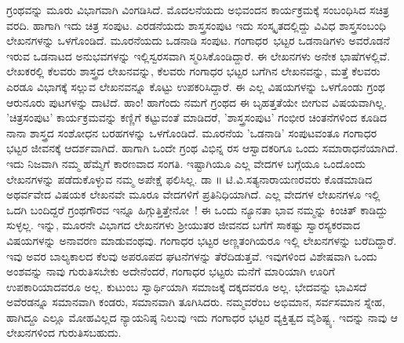 {ಗ್ರಂಥವನ್ನು ಮೂರು ವಿಭಾಗವಾಗಿ ವಿಂಗಡಿಸಿದೆ. ಮೊದಲನೆಯದು ಅಭಿವಂದನ ಕಾರ್ಯಕ್ರಮಕ್ಕೆ ಸಂಬಂಧಿಸಿದ ಸಚಿತ್ರ ವರದಿ. ಹಾಗಾಗಿ ಇದು ಚಿತ್ರ ಸಂಪುಟ. ಎರಡನೆಯದು ಶಾಸ್ತ್ರಸಂಪುಟ \enginline{-} ಇದು ಸಂಸ್ಕೃತದಲ್ಲಿದ್ದು ವಿವಿಧ ಶಾಸ್ತ್ರಸಂಬಂಧಿ ಲೇಖನಗಳನ್ನು ಒಳಗೊಂಡಿದೆ. ಮೂರನೆಯದು  ಒಡನಾಡಿ ಸಂಪುಟ. \hbox{ಗಂಗಾಧರ ಭಟ್ಟರ} ಒಡನಾಡಿಗಳು ಅವರೊಡನೆ ಇರುವ ಒಡನಾಟದ ಅನುಭವಗಳನ್ನು ಇಲ್ಲಿ\break ಸ್ವರಸವಾಗಿ ಸ್ಮರಿಸಿಕೊಂಡಿದ್ದಾರೆ. ಈ ಲೇಖನಗಳು ಅನೇಕ ಭಾಷೆಗಳಲ್ಲಿವೆ. \hbox{ಲೇಖಕರಲ್ಲಿ} ಕೆಲವರು ಶಾಸ್ತ್ರದ ಲೇಖನವನ್ನು, ಕೆಲವರು ಗಂಗಾಧರ ಭಟ್ಟರ ಬಗೆಗಿನ ಲೇಖನವನ್ನು, ಮತ್ತೆ ಕೆಲವರು ಎರಡೂ ವಿಭಾಗಕ್ಕೆ ಸಲ್ಲುವ ಲೇಖನ\-ವನ್ನೂ ಕೊಟ್ಟು ಉಪಕರಿಸಿದ್ದಾರೆ. ಈ ಎಲ್ಲ ವಿಷಯಗಳನ್ನು ಒಳಗೊಂಡು ಗ್ರಂಥ ಆರುನೂರು ಪುಟಗಳನ್ನು \hbox{ದಾಟಿದೆ.} ಹಾಂ! ಹಾಗೆಂದು ನಮಗೆ ಗ್ರಂಥದ ಈ ಬೃಹತ್ತತೆಯೇ ಬೀಗುವ ವಿಷಯವಾಗಿಲ್ಲ. 'ಚಿತ್ರ\-ಸಂಪುಟ' ಕಾರ್ಯಕ್ರಮವನ್ನು ಕಣ್ಣಿಗೆ ಕಟ್ಟುವಂತೆ ಮಾಡಿದರೆ, \hbox{'ಶಾಸ್ತ್ರಸಂಪುಟ'} ಗಂಭೀರ ಚಿಂತನೆಗಳಿಂದ ಕೂಡಿದ ನಾನಾ ಶಾಸ್ತ್ರದ ಸಂಶೋಧನ ಬರಹಗಳನ್ನು ಒಳಗೊಂಡಿದೆ. ಮೂರನೆಯ 'ಒಡನಾಡಿ' ಸಂಪುಟವಂತೂ ಗಂಗಾಧರ ಭಟ್ಟರ ಜೀವನಕ್ಕೆ \hbox{ಆದರ್ಶವಾಗಿದೆ.} ಹಾಗಾಗಿ ಒಂದೇ ಗ್ರಂಥ  ವಿಭಿನ್ನ ರಸ \hbox{ಆಸ್ವಾದಕರಿಗೂ} ಒಂದು ಸಮಾರಾಧನೆಯಾಗಿದೆ. ಇದು ನಿಜವಾಗಿ ನಮ್ಮ ಹೆಮ್ಮೆಗೆ ಕಾರಣವಾದ ಸಂಗತಿ. ಇಷ್ಟಾಗಿಯೂ ಎಲ್ಲ ವೇದಗಳ ಬಗ್ಗೆಯೂ ಒಂದೊಂದು ಲೇಖನಗಳನ್ನು ಪಡೆದುಕೊಳ್ಳುವ ನಮ್ಮ ಅಪೇಕ್ಷೆ ಫಲಿಸಿಲ್ಲ. ಡಾ ॥ ಟಿ.ವಿ.ಸತ್ಯನಾರಾಯಣರವರು ಕೊಡಮಾಡಿದ ಅಥರ್ವವೇದ ವಿಷಯಕ ಲೇಖನವೇ ಮೂರೂ ವೇದಗಳಿಗೆ ಪ್ರತಿನಿಧಿಯಾಗಿದೆ. ಎಲ್ಲ ವೇದಗಳ ಲೇಖನಗಳೂ ಇಲ್ಲಿ ಒದಗಿ ಬಂದಿದ್ದರೆ ಗ್ರಂಥಗೌರವ ಇನ್ನೂ \hbox{ಹಿಗ್ಗುತ್ತಿತ್ತೇನೋ~!} ಈ ಒಂದು ನ್ಯೂನತಾ ಭಾವ ನಮ್ಮನ್ನು ಕಿಂಚಿತ್ ಕಾಡಿದ್ದು ಸುಳ್ಳಲ್ಲ.
ಇನ್ನು, \hbox{ಮೂರನೇ} ವಿಭಾಗದ ಲೇಖನಗಳು ಶ್ರೀಯುತರ ಜೀವನದ ಬಗೆಗೆ ಸಾಕಷ್ಟು  ಸ್ವಾರಸ್ಯಕರವಾದ ವಿಷಯಗಳನ್ನು ಅನಾವರಣ ಮಾಡುವಂಥವು. ಗಂಗಾಧರ ಭಟ್ಟರ ಅಣ್ಣತಂಗಿಯರೂ ಇಲ್ಲಿ ಲೇಖನಗಳನ್ನು ಬರೆದಿದ್ದಾರೆ. ಇವು ಅವರ ಬಾಲ್ಯಕಾಲದ ಕೆಲವು ಅಪರೂಪದ ಘಟನೆಗಳನ್ನು ತೆರೆದಿಡುತ್ತವೆ. ಇವುಗಳಿಂದ ವಿಶೇಷವಾಗಿ ಒಂದು ಅಂಶವನ್ನು ನಾವು \hbox{ಗುರುತಿಸಬೇಕು} \enginline{-} ಅದೇನೆಂದರೆ, ಗಂಗಾಧರ ಭಟ್ಟರು ಮನೆಗೆ ಮಾರಿಯಾಗಿ ಊರಿಗೆ ಉಪಕಾರಿಯಾದವರೂ ಅಲ್ಲ. ಕುಟುಂಬ \hbox{ಸ್ವಾರ್ಥಿಯಾಗಿ} ಸಮಾಜಕ್ಕೆ ದಕ್ಕದವರೂ ಅಲ್ಲ. ಭೇದವನ್ನು ಭಾವಿಸದೆ ಅವೆರಡನ್ನೂ ಸಮಾನವಾಗಿ ಕಂಡರು, ಸಮಾನವಾಗಿ \hbox{ತೂಗಿಸಿದರು.} ನಮ್ಮವರೆಂಬ ಅಭಿಮಾನ, ಸರ್ವಸಮಾನ ಸ್ನೇಹ, \hbox{ಹಾಗಿದ್ದೂ} ಎಲ್ಲೂ \hbox{ಮೋಹವಿಲ್ಲದ} ನ್ಯಾಯನಿಷ್ಠ ನಿಲುವು \enginline{-} ಇದು ಗಂಗಾಧರ ಭಟ್ಟರ ವ್ಯಕ್ತಿತ್ವದ ವೈಶಿಷ್ಟ್ಯ. ಇದನ್ನು ನಾವು ಆ ಲೇಖನಗಳಿಂದ ಗುರುತಿಸಬಹುದು.


}

